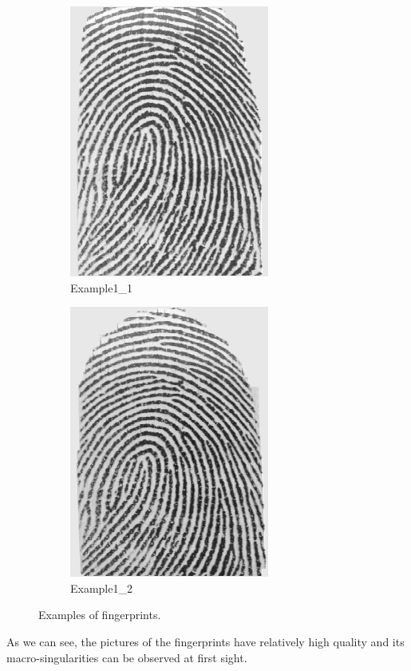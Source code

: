 \documentclass[a4paper]{article}
\begin{document}
\begin{figure}[H]
  \centering
       \begin{subfigure}[t]{0.45\textwidth}
         \centering
         \includegraphics[scale=0.6]{Figures/example1_1}
         \caption{Example1\_1}
     \end{subfigure}%
     \quad
     \begin{subfigure}[t]{0.45\textwidth}
         \centering
         \includegraphics[scale=0.6]{Figures/example1_2}
         \caption{Example1\_2}
     \end{subfigure}
    \caption{Examples of fingerprints.}
    \label{fig:ex1a}
\end{figure}

As we can see, the pictures of the fingerprints have relatively high quality and its macro-singularities can be observed at first sight.
\end{document}
